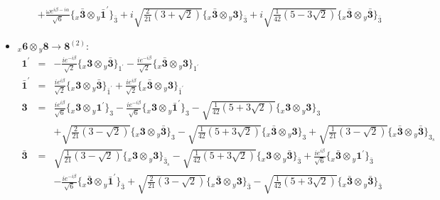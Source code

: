 \documentclass[english]{article}
\newcommand{\rep}[1]{\mathbf{#1}}
\newcommand{\repx}[2]{{}_{#2}\mathbf{#1}}
\newcommand{\subcg}[3]{\big\{ \repx{#1}{x}\otimes\repx{#2}{y}\big\}^{}_{#3}}
\begin{document}
\begin{itemize}
\begin{eqnarray*}
 & & +\frac{\omega  e^{i \beta -i \alpha }}{\sqrt{6}}\subcg{\bar{3}}{\bar{1}^{\prime}}{\bar{3}}+i \sqrt{\frac{2}{21} \left(3+\sqrt{2}\right)}\subcg{\bar{3}}{3}{\bar{3}}+i \sqrt{\frac{1}{42} \left(5-3 \sqrt{2}\right)}\subcg{\bar{3}}{\bar{3}}{\bar{3}}
\end{eqnarray*}
\item $\repx{6}{x}\otimes\repx{8}{y}\to\rep{8}^{(2)}$:
\begin{eqnarray*}
\rep{1^{\prime}} &=& -\frac{i e^{-i \beta }}{\sqrt{2}}\subcg{3}{\bar{3}}{1^{\prime}}-\frac{i e^{-i \beta }}{\sqrt{2}}\subcg{\bar{3}}{3}{1^{\prime}}
\\
\rep{\bar{1}^{\prime}} &=& \frac{i e^{i \beta }}{\sqrt{2}}\subcg{3}{\bar{3}}{\bar{1}^{\prime}}+\frac{i e^{i \beta }}{\sqrt{2}}\subcg{\bar{3}}{3}{\bar{1}^{\prime}}
\\
\rep{3} &=& \frac{i e^{i \beta }}{\sqrt{6}}\subcg{3}{1^{\prime}}{3}-\frac{i e^{-i \beta }}{\sqrt{6}}\subcg{3}{\bar{1}^{\prime}}{3}-\sqrt{\frac{1}{42} \left(5+3 \sqrt{2}\right)}\subcg{3}{3}{3} \\ 
 & & +\sqrt{\frac{2}{21} \left(3-\sqrt{2}\right)}\subcg{3}{\bar{3}}{3}-\sqrt{\frac{1}{42} \left(5+3 \sqrt{2}\right)}\subcg{\bar{3}}{3}{3}+\sqrt{\frac{1}{21} \left(3-\sqrt{2}\right)}\subcg{\bar{3}}{\bar{3}}{3_{s}}
\\
\rep{\bar{3}} &=& \sqrt{\frac{1}{21} \left(3-\sqrt{2}\right)}\subcg{3}{3}{\bar{3}_{s}}-\sqrt{\frac{1}{42} \left(5+3 \sqrt{2}\right)}\subcg{3}{\bar{3}}{\bar{3}}+\frac{i e^{i \beta }}{\sqrt{6}}\subcg{\bar{3}}{1^{\prime}}{\bar{3}} \\ 
 & & -\frac{i e^{-i \beta }}{\sqrt{6}}\subcg{\bar{3}}{\bar{1}^{\prime}}{\bar{3}}+\sqrt{\frac{2}{21} \left(3-\sqrt{2}\right)}\subcg{\bar{3}}{3}{\bar{3}}-\sqrt{\frac{1}{42} \left(5+3 \sqrt{2}\right)}\subcg{\bar{3}}{\bar{3}}{\bar{3}}
\end{eqnarray*}
\end{itemize}
\end{document}
